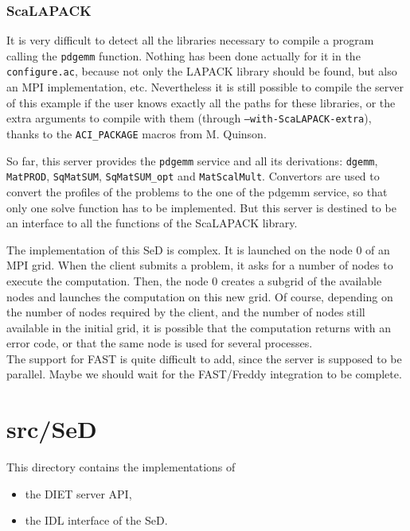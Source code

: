 {  \subsubsection{ScaLAPACK}

  It is very difficult to detect all the libraries necessary to compile a program
  calling the \texttt{pdgemm} function. Nothing has been done actually for it in
  the \texttt{configure.ac}, because not only the LAPACK library should be found,
  but also an MPI implementation, etc. Nevertheless it is still possible to
  compile the server of this example if the user knows exactly all the paths for
  these libraries, or the extra arguments to compile with them (through
      \texttt{--with-ScaLAPACK-extra}), thanks to the \texttt{ACI\_PACKAGE} macros
  from M. Quinson.

  So far, this server provides the \texttt{pdgemm} service and all its
  derivations: \texttt{dgemm}, \texttt{MatPROD}, \texttt{SqMatSUM},
  \texttt{SqMatSUM\_opt} and \texttt{MatScalMult}. Convertors are used to convert
  the profiles of the problems to the one of the pdgemm service, so that only one
  solve function has to be implemented. But this server is destined to be an
  interface to all the functions of the ScaLAPACK library.

  The implementation of this SeD is complex. It is launched on the node 0 of an
  MPI grid. When the client submits a problem, it asks for a number of nodes to
  execute the computation. Then, the node 0 creates a subgrid of the available
  nodes and launches the computation on this new grid. Of course, depending on the
  number of nodes required by the client, and the number of nodes still available
  in the initial grid, it is possible that the computation returns with an error
  code, or that the same node is used for several processes.
  \\

  The support for FAST is quite difficult to add, since the server is supposed to
  be parallel. Maybe we should wait for the FAST/Freddy integration to be
  complete.



  \section{\textsf{src/SeD}}
  \label{s:SeD}

  This directory contains the implementations of
  \begin{itemize}
  \item the DIET server API,
  \item the IDL interface of the SeD.
  \end{itemize}
  \

}
